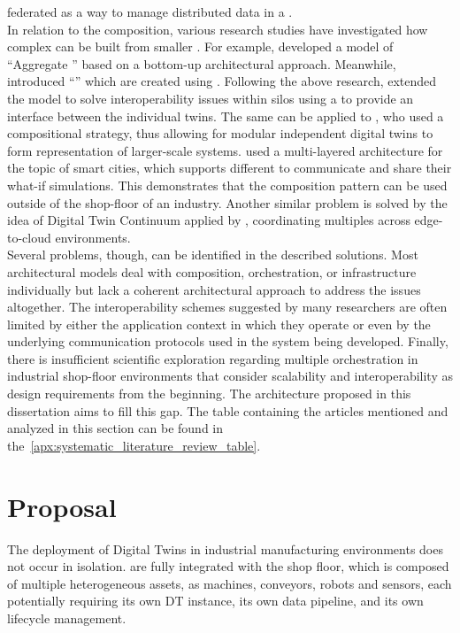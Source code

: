 federated \DTs as a way to manage distributed data in a \DTE.\\
In relation to the composition, various research studies have investigated how complex \DTs can be built from smaller \DTs. 
For example, \cite{Schroeder2021} developed a model of ``Aggregate \DTs'' based on a bottom-up architectural approach. 
Meanwhile, \cite{Mahoro2023} introduced ``\CDTs'' which are created using \ADTs. 
Following the above research, \cite{Kuruppuarachchi2023} extended the \CDT model to solve interoperability issues within \DT silos 
using a \DTConnector to provide an interface between the individual twins. The same can be applied 
to \cite{Talasila2025}, who used a compositional \DT strategy, thus allowing for modular independent digital twins to form 
representation of larger-scale systems. \cite{Lai2024} used a  multi-layered architecture for the topic of smart cities, which 
supports different \DTs to communicate and share their what-if simulations. This demonstrates that the composition pattern can be 
used outside of the shop-floor of an industry. Another similar problem is solved by the idea of Digital Twin Continuum applied 
by \cite{Barbone2024}, coordinating multiples \DTs across edge-to-cloud environments.\\
Several problems, though, can be identified in the described solutions. Most architectural models deal with composition, 
orchestration, or infrastructure individually but lack a coherent architectural approach to address the issues altogether. 
The interoperability schemes suggested by many researchers are often limited by either the application context in which they 
operate or even by the underlying communication protocols used in the system being developed. Finally, there is insufficient 
scientific exploration regarding multiple \DT orchestration in industrial shop-floor environments that consider scalability and 
interoperability as design requirements from the beginning. The architecture proposed in this dissertation aims to fill this gap. 
The table containing the articles mentioned and analyzed in this section can be found in the~\autoref{apx:systematic_literature_review_table}.

\chapter{Proposal}
\label{ch:proposal}

The deployment of Digital Twins in industrial manufacturing environments does not occur in isolation. \DTs are fully integrated with 
the shop floor, which is composed of multiple heterogeneous assets, as machines, conveyors, robots and sensors, each potentially 
requiring its own DT instance, its own data pipeline, and its own lifecycle management.


